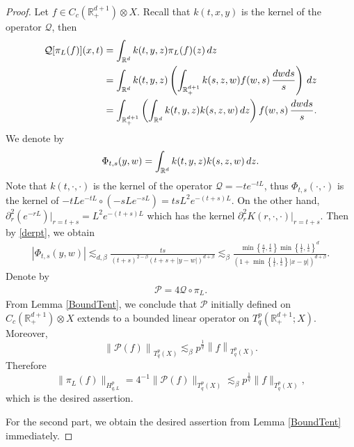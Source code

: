 \documentclass[10pt,a4paper]{amsart}
\newcommand\lk[1]{ \left\{ #1 \right\} }
\newcommand\norm[1]{ \left\| #1 \right\| }
\newcommand\sk[1]{ \left( #1 \right) }
\newcommand{\Q}{{\mathcal Q}}
\newcommand{\real}{{\mathbb R}}
\renewcommand\d{{\rm d}}
\begin{document}
\begin{proof}
Let $f\in C_c(\real^{d+1}_+)\otimes X$. Recall that $k(t, x, y)$ is the kernel of the operator $\Q$, then
\begin{equation}
\begin{split}
    \Q[\pi_L(f)](x, t) & = \int_{\real^d} k(t, y, z)\pi_L(f)(z) \,\d z  \\
    & = \int_{\real^d} k(t, y, z) \sk{ \int_{\real^{d+1}_+} k(s, z, w)f(w, s) \,\frac{\d w\d s}{s} } \,\d z  \\
    & = \int_{\real^{d+1}_+} \sk{ \int_{\real^d} k(t, y, z) k(s, z, w) \, \d z }f(w, s) \,\frac{\d w\d s}{s}.
\end{split}
\end{equation}
We denote by
\[
    \Phi_{t, s}(y, w) = \int_{\real^d} k(t, y, z) k(s, z, w) \, \d z. 
\]
Note that $k(t, \cdot, \cdot)$ is the kernel of the operator $\Q=-te^{-tL}$, thus $\Phi_{t,s}(\cdot,\cdot)$ is the kernel of $-tLe^{-tL}\circ(-sLe^{-sL})=tsL^2e^{-(t+s)L}$. On the other hand, $\partial^2_r (e^{-rL})|_{r=t+s}=L^2e^{-(t+s)L}$ which has the kernel $\partial^2_r K(r,\cdot,\cdot)|_{r=t+s}$. Then by \eqref{derpt}, we obtain 
\begin{align*}
    |\Phi_{t, s}(y, w)| \lesssim_{d, \beta} \frac{ts}{(t+s)^{2-\beta}(t+s+|y - w|)^{d+ \beta} }  \lesssim_{\beta} \frac{ \min\lk{\frac{s}{t},  \frac{t}{s}} \min\lk{ \frac{1}{t}, \frac{1}{s} }^d }{\sk{ 1 + \min\lk{ \frac{1}{t}, \frac{1}{s} }|x - y| }^{d + \beta}  }.
\end{align*}
Denote by 
\begin{align}\label{Proj}
    \mathcal{P} = 4 \mathcal Q \circ \pi_L. 
\end{align}
 From Lemma \ref{BoundTent}, we conclude that $\mathcal{P}$ initially defined on $C_c(\real^{d+1}_+)\otimes X$ extends to a bounded linear operator on $T^p_q(\real^{d+1}_+; X)$. Moreover,
\[
    \norm{  \mathcal{P}(f) }_{T^p_q(X)} \lesssim_{\beta} p^{\frac{1}{q}}\norm{ f}_{T^p_q(X)}.
\]
Therefore
\[
    \| \pi_L(f) \|_{H^p_{q, L}} = 4^{-1}\| \mathcal{P}(f) \|_{T^p_{q}(X)} \lesssim_{\beta} p^{\frac{1}{q}}\| 
    f \|_{T^p_q(X)},
\]
which is the desired assertion.

For the second part, we obtain the desired assertion from Lemma \ref{BoundTent} immediately.
\end{proof}
\end{document}
